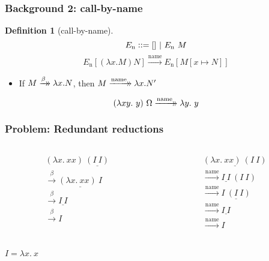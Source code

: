 \documentclass[dvipdfmx,cjk,xcolor=dvipsnames,envcountsect,notheorems,12pt]{beamer}
\theoremstyle{definition}
\newtheorem{definition}{Definition}
\newcommand{\xtwoheadrightarrow}[2][]{%
  \xrightarrow[#1]{#2}\mathrel{\mkern-14mu}\rightarrow
}
\newcommand{\FULLBETA}{\xrightarrow{\beta}}
\newcommand{\CALLBYNAME}{\xrightarrow{\mathrm{name}}}
\newcommand{\RTCLOSFULLBETA}{\xtwoheadrightarrow{\beta}}
\newcommand{\RTCLOSCALLBYNAME}{\xtwoheadrightarrow{\mathrm{name}}}
\begin{document}
\begin{frame}
	\frametitle{Background 2: call-by-name}
	\begin{definition}[call-by-name]
		\Large
		\[ E_\mathrm{n} \vcentcolon\vcentcolon= [] ~|~ E_\mathrm{n}~M \]
		\[ E_\mathrm{n}[(\lambda x.M)N] \CALLBYNAME E_\mathrm{n}[M[x \mapsto N]] \]
	\end{definition}
	\begin{itemize}
		\item If $M \RTCLOSFULLBETA \lambda x. N$, then $M \RTCLOSCALLBYNAME \lambda x. N'$
	\end{itemize}
	\Large \[(\lambda xy.~y)~\Omega \RTCLOSCALLBYNAME \lambda y.~y\]
\end{frame}

\begin{frame}
	\frametitle{Problem: Redundant reductions}
	\Large
	\begin{columns}[t]
		\begin{column}{0.3\textwidth}
			\[\begin{array}{l}
				(\lambda x.~xx)~\underline{(I~I)} \\
				\FULLBETA \underline{(\lambda x.~xx)~I} \\
				\FULLBETA \underline{I~I} \\
				\FULLBETA I \\
			\end{array}\]
		\end{column}
		\begin{column}{0.4\textwidth}
			\[\begin{array}{l}
				\underline{(\lambda x.~xx)~(I~I)} \\
				\CALLBYNAME \underline{I~I}~(I~I) \\
				\CALLBYNAME \underline{I~(I~I)} \\
				\CALLBYNAME \underline{I~I} \\
				\CALLBYNAME I \\
			\end{array}\]
		\end{column}
	\end{columns}
	\vfill
	\begin{flushright}
		\Large $I=\lambda x.~x$
	\end{flushright}
\end{frame}
\end{document}

